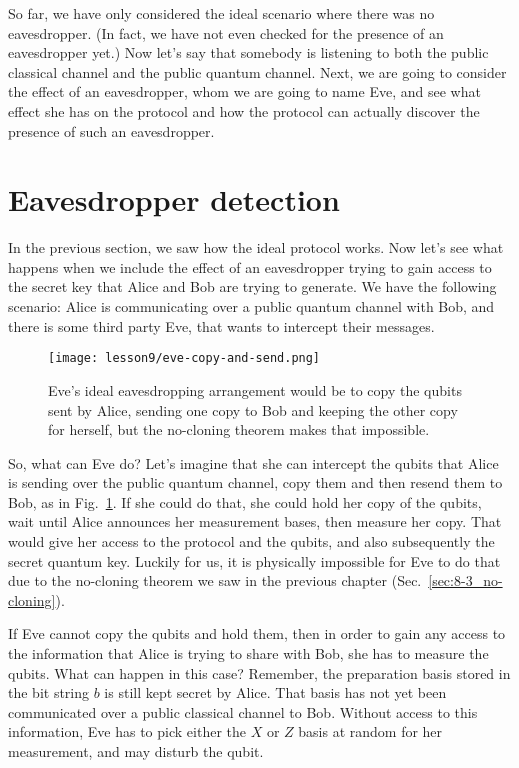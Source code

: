 So far, we have only considered the ideal scenario where there was no eavesdropper.  (In fact, we have not even checked for the presence of an eavesdropper yet.) Now let's say that somebody is listening to both the public classical channel and the public quantum channel. Next, we are going to consider the effect of an eavesdropper, whom we are going to name Eve, and see what effect she has on the protocol and how the protocol can actually discover the presence of such an eavesdropper.

\section{Eavesdropper detection}

In the previous section, we saw how the ideal protocol works. Now let's see what happens when we include the effect of an eavesdropper trying to gain access to the secret key that Alice and Bob are trying to generate.  We have the following scenario: Alice is communicating over a public quantum channel with Bob, and there is some third party Eve, that wants to intercept their messages.


\begin{figure}[H]
    \centering
    \texttt{[image: lesson9/eve-copy-and-send.png]}
        \caption[Eve's ideal (but impossible) eavesdropping arrangement]{Eve's ideal eavesdropping arrangement would be to copy the qubits sent by Alice, sending one copy to Bob and keeping the other copy for herself, but the no-cloning theorem makes that impossible.}
    \label{fig:eve-copy-and-send}
\end{figure}


So, what can Eve do? Let's imagine that she can intercept the qubits that Alice is sending over the public quantum channel, copy them and then resend them to Bob, as in Fig.~\ref{fig:eve-copy-and-send}. If she could do that, she could hold her copy of the qubits, wait until Alice announces her measurement bases, then measure her copy.  That would give her access to the protocol and the qubits, and also subsequently the secret quantum key. Luckily for us, it is physically impossible for Eve to do that due to the no-cloning theorem we saw in the previous chapter (Sec.~\ref{sec:8-3_no-cloning}).

If Eve cannot copy the qubits and hold them, then in order to gain any access to the information that Alice is trying to share with Bob, she has to measure the qubits. What can happen in this case? Remember, the preparation basis stored in the bit string $b$ is still kept secret by Alice. That basis has not yet been communicated over a public classical channel to Bob. Without access to this information, Eve has to pick either the $X$ or $Z$ basis at random for her measurement, and may disturb the qubit.

